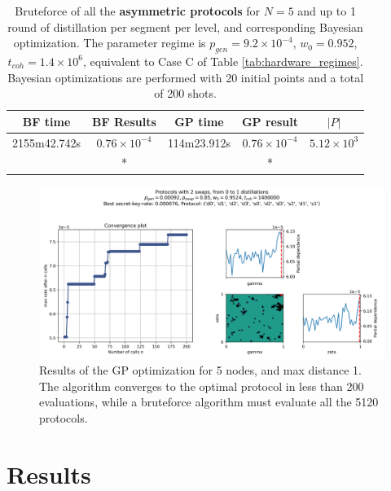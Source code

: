 \documentclass{article}
\begin{document}
\begin{table}[ht!]
  \centering
  \begin{tabular}{|c|c|c|c|c|}
      \hline
      BF time & BF Results & GP time & GP result & $|P|$ \\
      \hline
      2155m42.742s & $0.76 \times 10^{-4}$ & 114m23.912s & $0.76 \times 10^{-4}$ & $5.12 \times 10^{3}$ \\
      & *\footnotemark[1] & & *\footnotemark[1] & \\
      \hline
  \end{tabular}
  \caption{Bruteforce of all the \textbf{asymmetric protocols} for $N=5$ and up to 1 round of distillation per segment per level, and corresponding Bayesian optimization. The parameter regime is $p_{gen} = 9.2 \times 10^{-4}$, $w_0 = 0.952$, $t_{coh} = 1.4 \times 10^6$, equivalent to Case C of Table \ref{tab:hardware_regimes}. \\ Bayesian optimizations are performed with 20 initial points and a total of 200 shots.}
  \label{tab:validation_regimes}
\end{table}


\begin{figure}[ht!]
  \centering
  \includegraphics[width=\linewidth, trim=10 10 10 20, clip]{asymmetric/results_gp_tcoh1400000_pgen0.00092_pswap0.85_w00.9524_nodes5_maxdists1/0.9524_2_swaps_skopt_gp.png}
  \caption{Results of the GP optimization for 5 nodes, and max distance 1. The algorithm converges to the optimal protocol in less than 200 evaluations, while a bruteforce algorithm must evaluate all the 5120 protocols.}
  \label{fig:gp_results}
\end{figure}

\newpage
\section*{Results}
\end{document}
